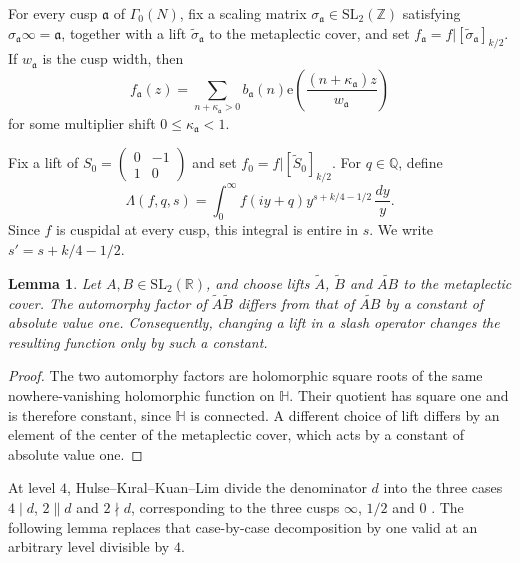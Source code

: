 \documentclass[11pt]{amsart}
\newtheorem{lemma}[theorem]{Lemma}
\theoremstyle{remark}
\newcommand{\e}{\mathrm{e}}
\newcommand{\R}{\mathbb R}
\newcommand{\Q}{\mathbb Q}
\newcommand{\Z}{\mathbb Z}
\newcommand{\Hh}{\mathbb H}
\newcommand{\wt}{\widetilde}
\begin{document}
For every cusp $\mathfrak a$ of $\Gamma_0(N)$, fix a scaling matrix
$\sigma_{\mathfrak a}\in\mathrm{SL}_2(\Z)$ satisfying
$\sigma_{\mathfrak a}\infty=\mathfrak a$, together with a lift
$\wt\sigma_{\mathfrak a}$ to the metaplectic cover, and set
$f_{\mathfrak a}=f|[\wt\sigma_{\mathfrak a}]_{k/2}$. If
$w_{\mathfrak a}$ is the cusp width, then
\[
f_{\mathfrak a}(z)=\sum_{n+\kappa_{\mathfrak a}>0}b_{\mathfrak a}(n)
\e\left(\frac{(n+\kappa_{\mathfrak a})z}{w_{\mathfrak a}}\right)
\]
for some multiplier shift $0\leq\kappa_{\mathfrak a}<1$.

Fix a lift of $S_0=\begin{pmatrix}0&-1\\1&0\end{pmatrix}$ and set
$f_0=f|[\wt S_0]_{k/2}$. For $q\in\Q$, define
\[
\Lambda(f,q,s)=\int_0^\infty f(iy+q)y^{s+k/4-1/2}\,\frac{dy}{y}.
\]
Since $f$ is cuspidal at every cusp, this integral is entire in $s$. We
write $s'=s+k/4-1/2$.

\begin{lemma}\label{lem:metaplectic-constant}
Let $A,B\in\mathrm{SL}_2(\R)$, and choose lifts $\widetilde A$,
$\widetilde B$ and $\widetilde{AB}$ to the metaplectic cover. The
automorphy factor of $\widetilde A\widetilde B$ differs from that of
$\widetilde{AB}$ by a constant of absolute value one. Consequently,
changing a lift in a slash operator changes the resulting function only
by such a constant.
\end{lemma}

\begin{proof}
The two automorphy factors are holomorphic square roots of the same
nowhere-vanishing holomorphic function on $\Hh$. Their quotient has square
one and is therefore constant, since $\Hh$ is connected. A different
choice of lift differs by an element of the center of the metaplectic
cover, which acts by a constant of absolute value one.
\end{proof}

At level $4$, Hulse--K\i ral--Kuan--Lim divide the denominator $d$ into the three cases $4\mid d$, $2\parallel d$ and $2\nmid d$, corresponding to the three cusps $\infty$, $1/2$ and $0$ \cite[Lemma 4.3]{HKKL}. The following lemma replaces that case-by-case decomposition by one valid at an arbitrary level divisible by $4$.
\end{document}
